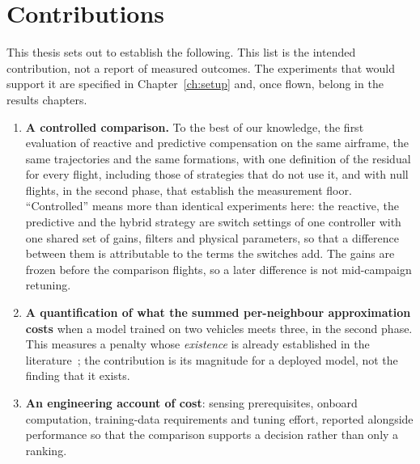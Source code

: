 \section{Contributions}
\label{sec:intro-contrib}

This thesis sets out to establish the following. This list is the intended contribution, not a
report of measured outcomes. The experiments that would support it are specified in
Chapter~\ref{ch:setup} and, once flown, belong in the results chapters.

\begin{enumerate}
  \item \textbf{A controlled comparison.} To the best of our knowledge, the first evaluation of
    reactive and predictive compensation on the same airframe, the same trajectories and the same
    formations, with one definition of the residual for every flight, including those of
    strategies that do not use it, and with null flights, in the second phase, that establish the
    measurement floor.
    ``Controlled'' means more than identical experiments here: the reactive, the predictive and the
    hybrid strategy are switch settings of one controller with one shared set of gains, filters and
    physical parameters, so that a difference between them is attributable to the terms the
    switches add. The gains are frozen before the comparison flights, so a later difference is not
    mid-campaign retuning.

  \item \textbf{A quantification of what the summed per-neighbour approximation costs} when a
    model trained on two vehicles meets three, in the second phase. This measures a penalty whose \emph{existence} is
    already established in the literature~\cite{shi2020neuralswarm,gielis2023aggregate}; the
    contribution is its magnitude for a deployed model, not the finding that it exists.

  \item \textbf{An engineering account of cost}: sensing prerequisites, onboard computation,
    training-data requirements and tuning effort, reported alongside performance so that the comparison supports a
    decision rather than only a ranking.

\end{enumerate}

